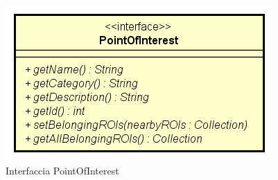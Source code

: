 \documentclass[../DefinizioneDiProdotto.tex]{subfiles}
\begin{document}
    \begin{figure}[H]
        \centering
        \includegraphics{img/PointOfInterest.png}
        \caption{Interfaccia PointOfInterest}\label{fig:model::navigator::graph::area::PointOfInterest} 
    \end{figure}
\end{document}
